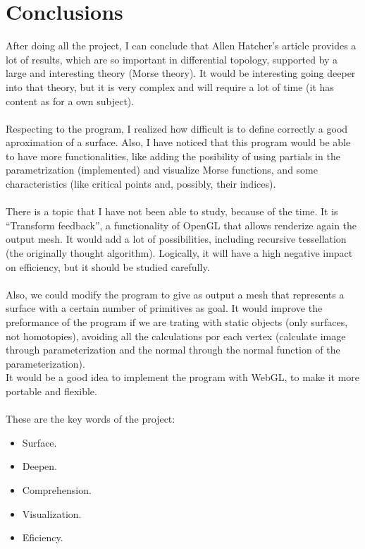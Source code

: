 \section*{Conclusions}
After doing all the project, I can conclude that Allen Hatcher's article \cite{arXiv:1312.3518} provides a lot of results, which are so important in differential topology, supported by a large and interesting theory (Morse theory). It would be interesting going deeper into that theory, but it is very complex and will require a lot of time (it has content as for a own subject).\\
\\Respecting to the program, I realized how difficult is to define correctly a good aproximation of a surface. Also, I have noticed that this program would be able to have more functionalities, like adding the posibility of using partials in the parametrization (implemented) and visualize Morse functions, and some characteristics (like critical points and, possibly, their indices).\\
\\There is a topic that I have not been able to study, because of the time. It is ``Transform feedback'', a functionality of OpenGL that allows renderize again the output mesh. It would add a lot of possibilities, including recursive tessellation (the originally thought algorithm). Logically, it will have a high negative impact on efficiency, but it should be studied carefully.\\
\\Also, we could modify the program to give as output a mesh that represents a surface with a certain number of primitives as goal. It would improve the preformance of the program if we are trating with static objects (only surfaces, not homotopies), avoiding all the calculations por each vertex (calculate image through parameterization and the normal through the normal function of the parameterization).
\\It would be a good idea to implement the program with WebGL, to make it more portable and flexible.\\
\\These are the key words of the project:
\begin{itemize}
	\item Surface.
	\item Deepen.
	\item Comprehension.
	\item Visualization.
	\item Eficiency.
\end{itemize}

\endinput
